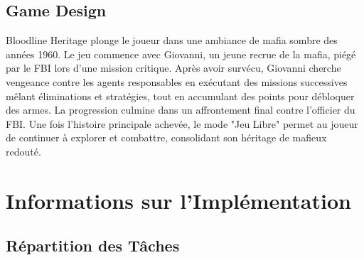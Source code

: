 \documentclass{report}
\begin{document}
\subsection{Game Design}

Bloodline Heritage plonge le joueur dans une ambiance de mafia sombre des années 1960. Le jeu commence avec Giovanni, un jeune recrue de la mafia, piégé par le FBI lors d'une mission critique. Après avoir survécu, Giovanni cherche vengeance contre les agents responsables en exécutant des missions successives mêlant éliminations et stratégies, tout en accumulant des points pour débloquer des armes. La progression culmine dans un affrontement final contre l'officier du FBI. Une fois l'histoire principale achevée, le mode "Jeu Libre" permet au joueur de continuer à explorer et combattre, consolidant son héritage de mafieux redouté.


\newpage
\section{Informations sur l'Implémentation}
\subsection{Répartition des Tâches}
\end{document}

